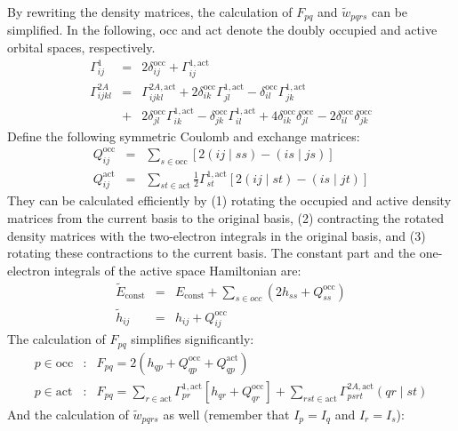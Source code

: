 \documentclass[11pt,a4paper]{article}
\begin{document}
By rewriting the density matrices, the calculation of $F_{pq}$ and $\widetilde{w}_{pqrs}$ can be simplified. In the following, occ and act denote the doubly occupied and active orbital spaces, respectively.
\begin{eqnarray}
\Gamma^1_{ij} & = & 2 \delta_{ij}^{\text{occ}} + \Gamma^{1,\text{act}}_{ij} \\
\Gamma^{2A}_{ijkl} & = & \Gamma^{2A,\text{act}}_{ijkl} + 2 \delta_{ik}^{\text{occ}} \Gamma^{1,\text{act}}_{jl} - \delta_{il}^{\text{occ}} \Gamma^{1,\text{act}}_{jk} \nonumber \\
& + & 2 \delta_{jl}^{\text{occ}} \Gamma^{1,\text{act}}_{ik} - \delta_{jk}^{\text{occ}} \Gamma^{1,\text{act}}_{il} + 4 \delta_{ik}^{\text{occ}} \delta_{jl}^{\text{occ}} - 2 \delta_{il}^{\text{occ}} \delta_{jk}^{\text{occ}}
\end{eqnarray}
Define the following symmetric Coulomb and exchange matrices:
\begin{eqnarray}
Q^{\text{occ}}_{ij} & = & \sum\limits_{s \in \text{occ}} \left[ 2 (ij \mid ss) - (is \mid js ) \right] \\
Q^{\text{act}}_{ij} & = & \sum\limits_{st \in \text{act}} \frac{1}{2} \Gamma^{1,\text{act}}_{st} \left[ 2 (ij \mid st) - (is \mid jt ) \right] 
\end{eqnarray}
They can be calculated efficiently by (1) rotating the occupied and active density matrices from the current basis to the original basis, (2) contracting the rotated density matrices with the two-electron integrals in the original basis, and (3) rotating these contractions to the current basis. The constant part and the one-electron integrals of the active space Hamiltonian are:
\begin{eqnarray}
 \widetilde{E}_{\text{const}} & = & E_{\text{const}} + \sum\limits_{s \in occ} \left( 2 h_{ss} + Q_{ss}^{\text{occ}} \right) \\
 \widetilde{h}_{ij} & = & h_{ij} + Q_{ij}^{\text{occ}} 
\end{eqnarray}
The calculation of $F_{pq}$ simplifies significantly:
\begin{eqnarray}
p \in \text{occ} & : & F_{pq} = 2 \left( h_{qp} + Q^{\text{occ}}_{qp} + Q^{\text{act}}_{qp} \right) \\
p \in \text{act} & : & F_{pq} = \sum\limits_{r \in \text{act}} \Gamma^{1,\text{act}}_{pr} \left[ h_{qr} + Q^{\text{occ}}_{qr} \right] +  \sum\limits_{rst \in \text{act}} \Gamma^{2A,\text{act}}_{psrt} (qr \mid st)
\end{eqnarray}
And the calculation of $\widetilde{w}_{pqrs}$ as well (remember that $I_p = I_q$ and $I_r = I_s$):
\end{document}
